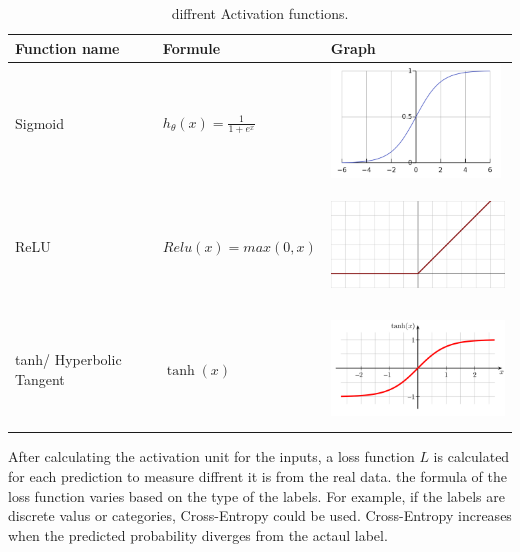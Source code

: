 \documentclass[runningheads]{llncs}
\begin{document}
\begin{table}
    \caption{diffrent Activation functions.}\label{tab1}
    \begin{tabular}{|l|l|l|}
    \hline
    Function name &  Formule & Graph\\
    \hline
    Sigmoid &  {$ h_ \theta (x) =  \frac{\mathrm{1} }{\mathrm{1} + e^{x} }  $ } &  \begin{minipage}{.3\textwidth}
        \includegraphics[width=\linewidth, height=30mm]{sigmoid}
      \end{minipage} \\
    ReLU &  {$Relu(x) = max(0,x) $} & \begin{minipage}{.3\textwidth}
        \includegraphics[width=\linewidth, height=30mm]{relu}
      \end{minipage}\\
    tanh/ Hyperbolic Tangent & {$\tanh({x})$} & \begin{minipage}{.3\textwidth}
        \includegraphics[width=\linewidth, height=30mm]{tanh}
      \end{minipage}\\
    \hline
    \end{tabular}
\end{table}

After calculating the activation unit for the inputs, a loss function $L$ is calculated for each prediction to measure 
diffrent it is from the real data. the formula of the loss function varies based on the type of the labels.
For example, if the labels are discrete valus or categories, 
Cross-Entropy could be used. Cross-Entropy increases when the predicted probability diverges from the actaul label. 
\end{document}
